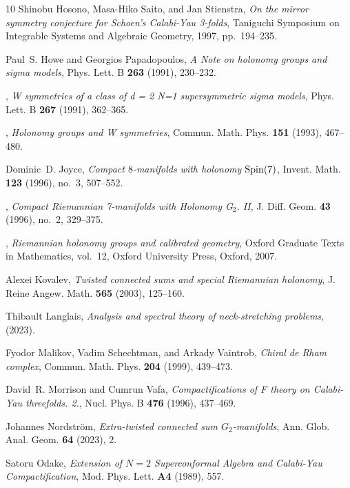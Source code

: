 \documentclass{pspum-l}
\theoremstyle{definition}
\theoremstyle{remark}
\numberwithin{equation}{section}
\begin{document}
\begin{thebibliography}{10}
Shinobu Hosono, Masa-Hiko Saito, and Jan Stienstra, \emph{{On the mirror
  symmetry conjecture for Schoen's Calabi-Yau 3-folds}}, {Taniguchi Symposium
  on Integrable Systems and Algebraic Geometry}, 1997, pp.~194--235.

Paul~S. Howe and Georgios Papadopoulos, \emph{{A Note on holonomy groups and
  sigma models}}, Phys. Lett. B \textbf{263} (1991), 230--232.

\bysame, \emph{{W symmetries of a class of d = 2 N=1 supersymmetric sigma
  models}}, Phys. Lett. B \textbf{267} (1991), 362--365.

\bysame, \emph{{Holonomy groups and W symmetries}}, Commun. Math. Phys.
  \textbf{151} (1993), 467--480.

Dominic~D. Joyce, \emph{Compact {$8$}-manifolds with holonomy {${\rm
  Spin}(7)$}}, Invent. Math. \textbf{123} (1996), no.~3, 507--552. 

\bysame, \emph{{Compact Riemannian 7-manifolds with Holonomy G$_2$. II}}, J.
  Diff. Geom. \textbf{43} (1996), no.~2, 329--375.

\bysame, \emph{Riemannian holonomy groups and calibrated geometry}, Oxford
  Graduate Texts in Mathematics, vol.~12, Oxford University Press, Oxford,
  2007. 

Alexei Kovalev, \emph{Twisted connected sums and special {R}iemannian
  holonomy}, J. Reine Angew. Math. \textbf{565} (2003), 125--160. 

Thibault Langlais, \emph{{Analysis and spectral theory of neck-stretching
  problems}},  (2023).

Fyodor Malikov, Vadim Schechtman, and Arkady Vaintrob, \emph{{Chiral de Rham
  complex}}, Commun. Math. Phys. \textbf{204} (1999), 439--473.

David~R. Morrison and Cumrun Vafa, \emph{{Compactifications of F theory on
  Calabi-Yau threefolds. 2.}}, Nucl. Phys. B \textbf{476} (1996), 437--469.

Johannes Nordstr\"om, \emph{{Extra-twisted connected sum $G_2$-manifolds}},
  Ann. Glob. Anal. Geom. \textbf{64} (2023), 2.

Satoru Odake, \emph{{Extension of $N=2$ Superconformal Algebra and Calabi-Yau
  Compactification}}, Mod. Phys. Lett. \textbf{A4} (1989), 557.


\end{thebibliography}
\end{document}
